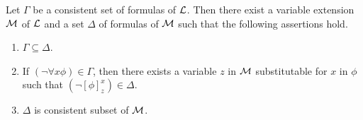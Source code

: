 \documentclass[10pt]{amsart}
\begin{document}
\begin{lemma}\label{lemma:superconsistent_extension}
	Let $\Gamma$ be a consistent set of formulas of ${\mathcal L}$. Then there exist a variable extension ${\mathcal M}$ of ${\mathcal L}$ and a set $\Delta$ of formulas of ${\mathcal M}$ such that the following assertions hold.
	\begin{enumerate}[label=\emph{\textbf{(\arabic*)}}, leftmargin=3.0em]
		\item $\Gamma \subseteq \Delta$.
		\item If $(\neg\forall x\phi) \in \Gamma$, then there exists a variable $z$ in ${\mathcal M}$ substitutable for $x$ in $\phi$ such that $(\neg[\phi]^x_z) \in \Delta$.
		\item $\Delta$ is consistent subset of
		      ${\mathcal M}$.
	\end{enumerate}
\end{lemma}
\end{document}
